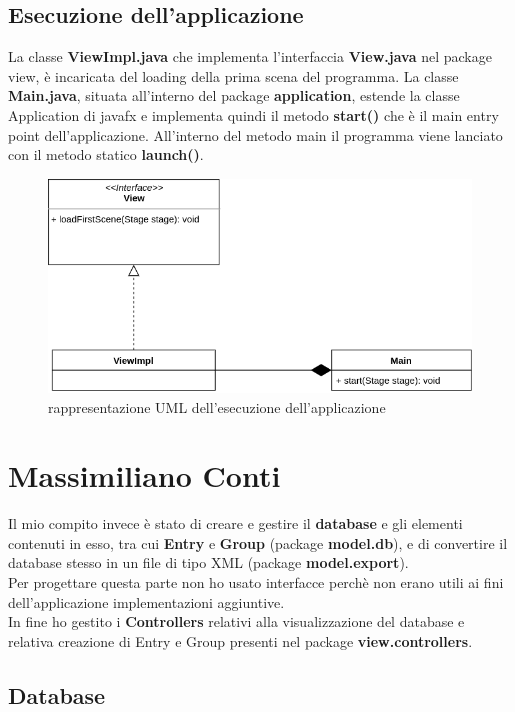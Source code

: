 \documentclass[a4paper,12pt]{report}
\begin{document}
\subsection*{Esecuzione dell'applicazione}
La classe \textbf{ViewImpl.java} che implementa l'interfaccia \textbf{View.java} nel package view, è incaricata del loading della prima scena del programma.
La classe \textbf{Main.java}, situata all'interno del package \textbf{application}, estende la classe Application di javafx e implementa quindi il metodo \textbf{start()} che è il main entry point dell'applicazione. All'interno del metodo main il programma viene lanciato con il metodo statico \textbf{launch()}.\\
\begin{figure}[h]
\centering{}
\includegraphics[width=\textwidth]{viewpart.png}
\caption{rappresentazione UML dell'esecuzione dell'applicazione}
\end{figure}


\section*{Massimiliano Conti}

Il mio compito invece è stato di creare e gestire il \textbf{database} e gli elementi contenuti in esso,
tra cui \textbf{Entry} e \textbf{Group} (package \textbf{model.db}), e di convertire il database stesso in un file di tipo XML (package \textbf{model.export}).\\
Per progettare questa parte non ho usato interfacce perchè non erano utili ai fini dell'applicazione implementazioni aggiuntive.\\
In fine ho gestito i \textbf{Controllers} relativi alla visualizzazione del database e relativa
creazione di Entry e Group presenti nel package \textbf{view.controllers}.

\subsection*{Database}
\end{document}
